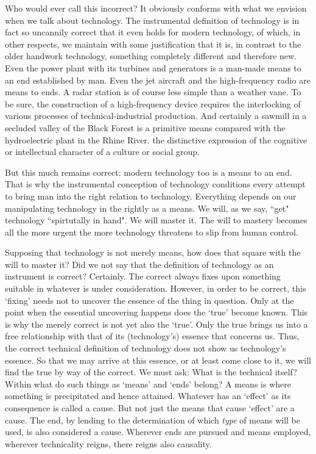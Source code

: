 \documentclass[paper=a4, fontsize=11pt,twoside]{scrartcl}
\begin{document}
Who would ever call this incorrect? It obviously conforms with what we envision when we talk about technology. The instrumental definition of technology is in fact so uncannily correct that it even holds for modern technology, of which, in other respects, we maintain with some justification that it is, in contrast to the older handwork technology, something completely different and therefore new. Even the power plant with its turbines and generators is a man-made means to an end established by man. Even the jet aircraft and the high-frequency radio are means to ends. A radar station is of course less simple than a weather vane. To be sure, the construction of a high-frequency device requires the interlocking of various processes of technical-industrial production. And certainly a sawmill in a secluded valley of the Black Forest is a primitive means compared with the hydroelectric plant in the Rhine River.
the distinctive expression of the cognitive or intellectual character of a culture or social group.

But this much remains correct: modern technology too is a means to an end. That is why the instrumental conception of technology conditions every attempt to bring man into the right relation to technology. Everything depends on our manipulating technology in the rightly as a means. We will, as we say, ``get" technology ``spirtutally in hand". We will master it. The will to mastery becomes all the more urgent the more technology threatens to slip from human control.

Supposing that technology is not merely means, how does that square with the will to master it? Did we not say that the definition of technology as an instrument is correct? Certainly. The correct always fixes upon something suitable in whatever is under consideration. However, in order to be correct, this `fixing' needs not to uncover the essence of the thing in question. Only at the point when the essential uncovering happens does the `true' become known. This is why the merely correct is not yet also the `true'. Only the true brings us into a free relationship with that of its (technology's) essence that concerns us. Thus, the correct technical definition of technology does not show us technology's essence. So that we may arrive at this essence, or at least come close to it, we will find the true by way of the correct. We must ask: What is the technical itself? Within what do such things as `means' and `ends' belong? A means is where something is precipitated and hence attained. Whatever has an `effect' as its consequence is called a cause. But not just the means that cause `effect' are a cause. The end, by lending to the determination of which \textit{type} of means will be used, is also considered a cause. Wherever ends are pursued and means employed, wherever technicality reigns, there reigns also causality.
\end{document}

